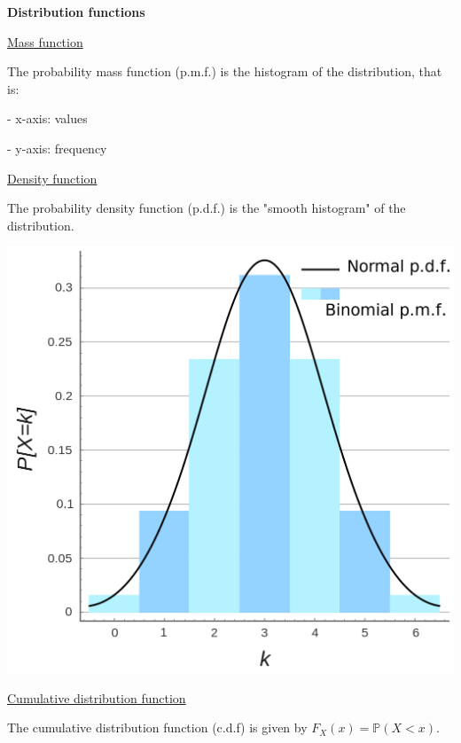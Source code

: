 {\fontsize{12pt}{22pt} \textbf{Distribution functions}\par}

\vspace{5mm}

\underline{Mass function}

The probability mass function (p.m.f.) is the histogram of the distribution, that is:

- x-axis: values

- y-axis: frequency

\vspace{5mm}

\underline{Density function}

The probability density function (p.d.f.) is the "smooth histogram" of the distribution.

\vspace{5mm}

\begin{center}
\includegraphics[scale=0.15]{mass_density_functions.png}
\end{center}

\vspace{5mm}

\underline{Cumulative distribution function}

The cumulative distribution function (c.d.f) is given by $F_X(x)= \mathbb{P}(X < x)$. 

